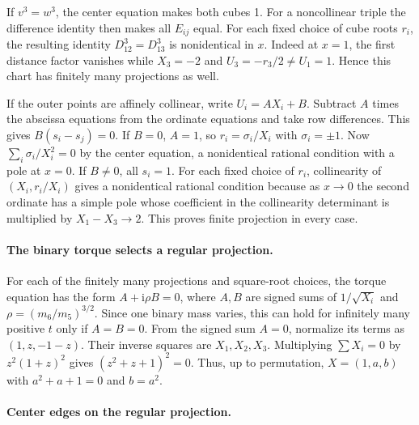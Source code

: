 \documentclass[11pt,letterpaper]{article}
\theoremstyle{definition}
\begin{document}
If $v^3=w^3$, the center equation makes both cubes 1. For a noncollinear triple the difference identity then makes all $E_{ij}$ equal. For each fixed choice of cube roots $r_i$, the resulting identity $D_{12}^3=D_{13}^3$ is nonidentical in $x$. Indeed at $x=1$, the first distance factor vanishes while $X_3=-2$ and $U_3=-r_3/2\ne U_1=1$. Hence this chart has finitely many projections as well.

If the outer points are affinely collinear, write $U_i=A X_i+B$. Subtract $A$ times the abscissa equations from the ordinate equations and take row differences. This gives $B(s_i-s_j)=0$. If $B=0$, $A=1$, so $r_i=\sigma_i/X_i$ with $\sigma_i=\pm1$. Now $\sum_i\sigma_i/X_i^2=0$ by the center equation, a nonidentical rational condition with a pole at $x=0$. If $B\ne0$, all $s_i=1$. For each fixed choice of $r_i$, collinearity of $(X_i,r_i/X_i)$ gives a nonidentical rational condition because as $x\to0$ the second ordinate has a simple pole whose coefficient in the collinearity determinant is multiplied by $X_1-X_3\to2$. This proves finite projection in every case.

\paragraph{The binary torque selects a regular projection.}

For each of the finitely many projections and square-root choices, the torque equation has the form $A+\mathrm i\rho B=0$, where $A,B$ are signed sums of $1/\sqrt{X_i}$ and $\rho=(m_6/m_5)^{3/2}$. Since one binary mass varies, this can hold for infinitely many positive $t$ only if $A=B=0$. From the signed sum $A=0$, normalize its terms as $(1,z,-1-z)$. Their inverse squares are $X_1,X_2,X_3$. Multiplying $\sum X_i=0$ by $z^2(1+z)^2$ gives $(z^2+z+1)^2=0$. Thus, up to permutation, $X=(1,a,b)$ with $a^2+a+1=0$ and $b=a^2$.

\paragraph{Center edges on the regular projection.}
\end{document}
